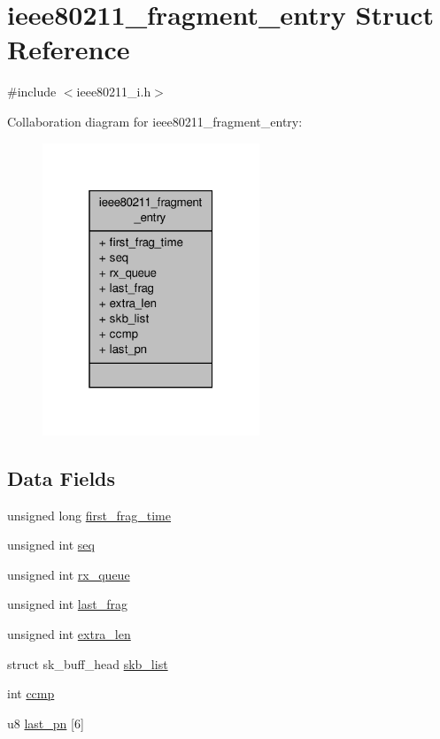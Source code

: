 \hypertarget{structieee80211__fragment__entry}{\section{ieee80211\-\_\-fragment\-\_\-entry Struct Reference}
\label{structieee80211__fragment__entry}
}


{\ttfamily \#include $<$ieee80211\-\_\-i.\-h$>$}



Collaboration diagram for ieee80211\-\_\-fragment\-\_\-entry\-:
\nopagebreak
\begin{figure}[H]
\begin{center}
\leavevmode
\includegraphics[width=184pt]{structieee80211__fragment__entry__coll__graph}
\end{center}
\end{figure}
\subsection*{Data Fields}
\begin{DoxyCompactItemize}
\item 
unsigned long \hyperlink{structieee80211__fragment__entry_aff13d3635e966dc5c9d34fcba0fa6a59}{first\-\_\-frag\-\_\-time}
\item 
unsigned int \hyperlink{structieee80211__fragment__entry_a1db4845df10d789835dcc97c392a2fe6}{seq}
\item 
unsigned int \hyperlink{structieee80211__fragment__entry_ae9c4670f6e34166d57315f460003eb00}{rx\-\_\-queue}
\item 
unsigned int \hyperlink{structieee80211__fragment__entry_afa570deed8cdb8b0d26a4f3ed9c3db4f}{last\-\_\-frag}
\item 
unsigned int \hyperlink{structieee80211__fragment__entry_afd84bbe6015ef3eb71afe651f3e9f72a}{extra\-\_\-len}
\item 
struct sk\-\_\-buff\-\_\-head \hyperlink{structieee80211__fragment__entry_ae572ad476d84353186dc8a596d035a92}{skb\-\_\-list}
\item 
int \hyperlink{structieee80211__fragment__entry_af0bf8d0a7415e0d80ce8876f9b5b69a5}{ccmp}
\item 
u8 \hyperlink{structieee80211__fragment__entry_a18ab2d23d6a5293bf2d38573afca820c}{last\-\_\-pn} \mbox{[}6\mbox{]}
\end{DoxyCompactItemize}


